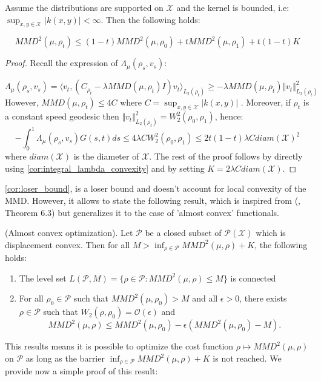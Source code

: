 %
\begin{corollary}
\label{cor:loser_bound}Assume the distributions are supported on
$\mathcal{X}$ and the kernel is bounded, i.e: $\sup_{x,y\in\mathcal{X}}\vert k(x,y)\vert<\infty$.
Then the following holds:

\[
MMD^{2}(\mu,\rho_{t})\leq(1-t)MMD^{2}(\mu,\rho_{0})+tMMD^{2}(\mu,\rho_{1})+t(1-t)K
\]
\end{corollary}
%
\begin{proof}
Recall the expression of $\Lambda_{\mu}(\rho_{s},v_{s}):$

\[
\Lambda_{\mu}(\rho_{s},v_{s})=\langle v_{t},(C_{\rho_{t}}-\lambda MMD(\mu,\rho_{t})I)v_{t}\rangle_{L_{2}(\rho_{t})}\geq-\lambda MMD(\mu,\rho_{t})\Vert v_{t}\Vert_{L_{2}(\rho_{t})}^{2}
\]
However, $MMD(\mu,\rho_{t})\leq4C$ where $C=\sup_{x,y\in\mathcal{X}}\vert k(x,y)\vert$
. Moreover, if $\rho_{t}$ is a constant speed geodesic then $\Vert v_{t}\Vert_{L_{2}(\rho_{t})}^{2}=W_{2}^{2}(\rho_{0},\rho_{1})$,
hence: 
\[
-\int_{0}^{1}\Lambda_{\mu}(\rho_{s},v_{s})G(s,t)ds\leq4\lambda CW_{2}^{2}(\rho_{0},\rho_{1})\leq2t(1-t)\lambda Cdiam(\mathcal{X})^{2}
\]
where $diam(\mathcal{X})$ is the diameter of $\mathcal{X}$. The
rest of the proof follows by directly using \ref{cor:integral_lambda_convexity}
and by setting $K=2\lambda Cdiam(\mathcal{X})$.
\end{proof}
%
\ref{cor:loser_bound}, is a loser bound and doesn't account for local
convexity of the MMD. However, it allows to state the following result,
which is inspired from (\cite{Bottou:2017}, Theorem 6.3) but generalizes
it to the case of 'almost convex' functionals.
\begin{proposition}

(Almost convex optimization). Let $\mathcal{P}$ be a closed subset
of $\mathcal{P}(\mathcal{X})$ which is displacement convex. Then
for all $M>\inf_{\rho\in\mathcal{P}}MMD^{2}(\mu,\rho)+K$, the following
holds:
\end{proposition}
\begin{enumerate}
\item The level set $L(\mathcal{P},M)=\{\rho\in\mathcal{P}:MMD^{2}(\mu,\rho)\leq M\}$
is connected
\item For all $\rho_{0}\in\mathcal{P}$ such that $MMD^{2}(\mu,\rho_0)>M$
and all $\epsilon>0$, there exists $\rho\in\mathcal{P}$ such that
$W_{2}(\rho,\rho_{0})=\mathcal{O}(\epsilon)$ and
\[
MMD^{2}(\mu,\rho)\leq MMD^{2}(\mu,\rho_{0})-\epsilon(MMD^{2}(\mu,\rho_{0})-M).
\]
\end{enumerate}
%
\begin{remark}
This results means it is possible to optimize the cost function $\rho\mapsto MMD^{2}(\mu,\rho)$
on $\mathcal{P}$ as long as the barrier $\inf_{\rho\in\mathcal{P}}MMD^{2}(\mu,\rho)+K$
is not reached. We provide now a simple proof of this result:
\end{remark}
